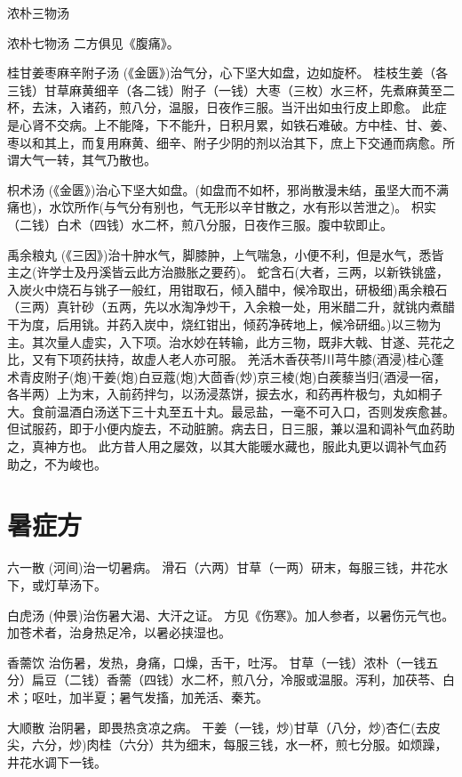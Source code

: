 \documentclass[a4paper,12pt,UTF8,twoside]{ctexbook}
\begin{document}
	浓朴三物汤
	
	浓朴七物汤
	二方俱见《腹痛》。
	
	桂甘姜枣麻辛附子汤
	(《金匮》)治气分，心下坚大如盘，边如旋杯。
	桂枝生姜（各三钱）甘草麻黄细辛（各二钱）附子（一钱）大枣（三枚）水三杯，先煮麻黄至二杯，去沫，入诸药，煎八分，温服，日夜作三服。当汗出如虫行皮上即愈。
	此症是心肾不交病。上不能降，下不能升，日积月累，如铁石难破。方中桂、甘、姜、枣以和其上，而复用麻黄、细辛、附子少阴的剂以治其下，庶上下交通而病愈。所谓大气一转，其气乃散也。
	
	枳术汤
	(《金匮》)治心下坚大如盘。(如盘而不如杯，邪尚散漫未结，虽坚大而不满痛也)，水饮所作(与气分有别也，气无形以辛甘散之，水有形以苦泄之)。
	枳实（二钱）白术（四钱）水二杯，煎八分服，日夜作三服。腹中软即止。
	
	禹余粮丸
	(《三因》)治十肿水气，脚膝肿，上气喘急，小便不利，但是水气，悉皆主之(许学士及丹溪皆云此方治臌胀之要药)。
	蛇含石(大者，三两，以新铁铫盛，入炭火中烧石与铫子一般红，用钳取石，倾入醋中，候冷取出，研极细)禹余粮石（三两）真针砂（五两，先以水淘净炒干，入余粮一处，用米醋二升，就铫内煮醋干为度，后用铫。并药入炭中，烧红钳出，倾药净砖地上，候冷研细。)以三物为主。其次量人虚实，入下项。治水妙在转输，此方三物，既非大戟、甘遂、芫花之比，又有下项药扶持，故虚人老人亦可服。
	羌活木香茯苓川芎牛膝(酒浸)桂心蓬术青皮附子(炮)干姜(炮)白豆蔻(炮)大茴香(炒)京三棱(炮)白蒺藜当归(酒浸一宿，各半两）上为末，入前药拌匀，以汤浸蒸饼，捩去水，和药再杵极匀，丸如桐子大。食前温酒白汤送下三十丸至五十丸。最忌盐，一毫不可入口，否则发疾愈甚。但试服药，即于小便内旋去，不动脏腑。病去日，日三服，兼以温和调补气血药助之，真神方也。
	此方昔人用之屡效，以其大能暖水藏也，服此丸更以调补气血药助之，不为峻也。
	
	

	\section{暑症方}	
	
	六一散
	(河间)治一切暑病。
	滑石（六两）甘草（一两）研末，每服三钱，井花水下，或灯草汤下。
	
	白虎汤
	(仲景)治伤暑大渴、大汗之证。
	方见《伤寒》。加人参者，以暑伤元气也。加苍术者，治身热足冷，以暑必挟湿也。
	
	香薷饮
	治伤暑，发热，身痛，口燥，舌干，吐泻。
	甘草（一钱）浓朴（一钱五分）扁豆（二钱）香薷（四钱）水二杯，煎八分，冷服或温服。泻利，加茯苓、白术；呕吐，加半夏；暑气发搐，加羌活、秦艽。
	
	大顺散
	治阴暑，即畏热贪凉之病。
	干姜（一钱，炒)甘草（八分，炒)杏仁(去皮尖，六分，炒)肉桂（六分）共为细末，每服三钱，水一杯，煎七分服。如烦躁，井花水调下一钱。
	
\end{document}
